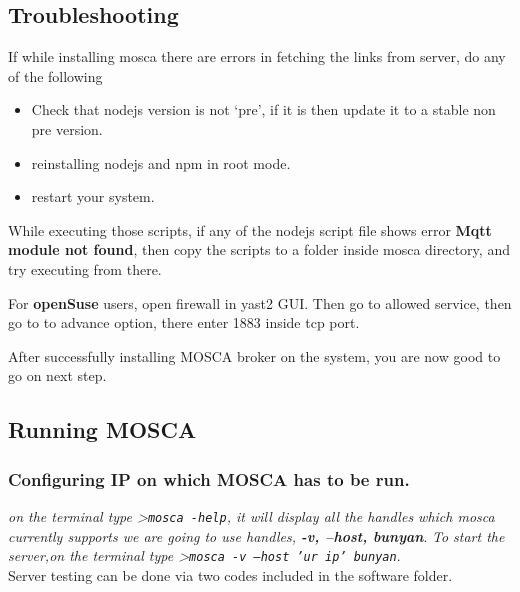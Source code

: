 \documentclass[16pt]{article}
\begin{document}
\vspace{0.5cm}

\subsection{Troubleshooting}


If while installing mosca there are errors in fetching the links from
server, do any of the following 

\begin{itemize}
	
	\item Check that nodejs version is not
	`pre', if it is then update it to a stable non pre version.
	\item reinstalling nodejs and npm in root mode. 
	\item restart your system.
	
\end{itemize}

While executing those scripts, if any of the nodejs script file shows
error \textbf{Mqtt module not found}, then copy the scripts to a folder
inside mosca directory, and try executing from there.

For \textbf{openSuse} users, open firewall in yast2 GUI. Then go to
allowed service, then go to to advance option, there enter 1883 inside
tcp port.

After successfully installing MOSCA broker on the system, you are now
good to go on next step.

\vspace{0.5cm}
\subsection{Running MOSCA}

\vspace{0.3cm}



\subsubsection{Configuring IP on which MOSCA has to be run.}

\emph{on the terminal type \textgreater{}\texttt{mosca -help}, it will
display all the handles which mosca currently supports we are going to
use handles, {\textbf{-v, --host, \textbar{} bunyan}}}. \emph{To start the server,on
the terminal type \textgreater{}\texttt{mosca -v --host 'ur ip'
\textbar{}bunyan}}. \\ Server testing can be done via two codes included in
the software folder.
\end{document}
